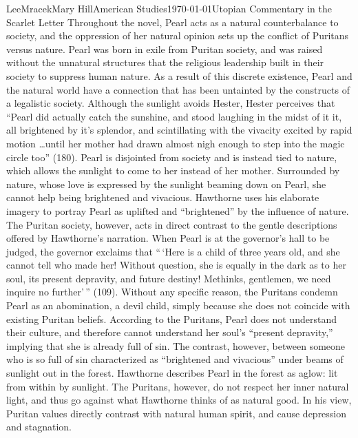 \documentclass[12pt, letterpaper]{article}
\begin{document}
\begin{mla}{Lee}{Mracek}{Mary Hill}{American Studies}{\today}{Utopian Commentary in the Scarlet Letter}
        Throughout the novel, Pearl acts as a natural counterbalance to society, and the oppression of her natural opinion sets up the conflict of Puritans versus nature. Pearl was born in exile from Puritan society, and was raised without the unnatural structures that the religious leadership built in their society to suppress human nature. As a result of this discrete existence, Pearl and the natural world have a connection that has been untainted by the constructs of a legalistic society. Although the sunlight avoids Hester, Hester perceives that ``Pearl did actually catch the sunshine, and stood laughing in the midst of it it, all brightened by it's splendor, and scintillating with the vivacity excited by rapid motion \ldots until her mother had drawn almost nigh enough to step into the magic circle too'' (180). Pearl is disjointed from society and is instead tied to nature, which allows the sunlight to come to her instead of her mother. Surrounded by nature, whose love is expressed by the sunlight beaming down on Pearl, she cannot help being brightened and vivacious. Hawthorne uses his elaborate imagery to portray Pearl as uplifted and ``brightened'' by the influence of nature. The Puritan society, however, acts in direct contrast to the gentle descriptions offered by Hawthorne's narration. When Pearl is at the governor's hall to be judged, the governor exclaims that ``\,`Here is a child of three years old, and she cannot tell who made her! Without question, she is equally in the dark as to her soul, its present depravity, and future destiny! Methinks, gentlemen, we need inquire no further'\,'' (109). Without any specific reason, the Puritans condemn Pearl as an abomination, a devil child, simply because she does not coincide with existing Puritan beliefs. According to the Puritans, Pearl does not understand their culture, and therefore cannot understand her soul's ``present depravity,'' implying that she is already full of sin. The contrast, however, between someone who is so full of sin characterized as ``brightened and vivacious'' under beams of sunlight out in the forest. Hawthorne describes Pearl in the forest as aglow: lit from within by sunlight. The Puritans, however, do not respect her inner natural light, and thus go against what Hawthorne thinks of as natural good. In his view, Puritan values directly contrast with natural human spirit, and cause depression and stagnation.\\

\end{mla}
\end{document}
